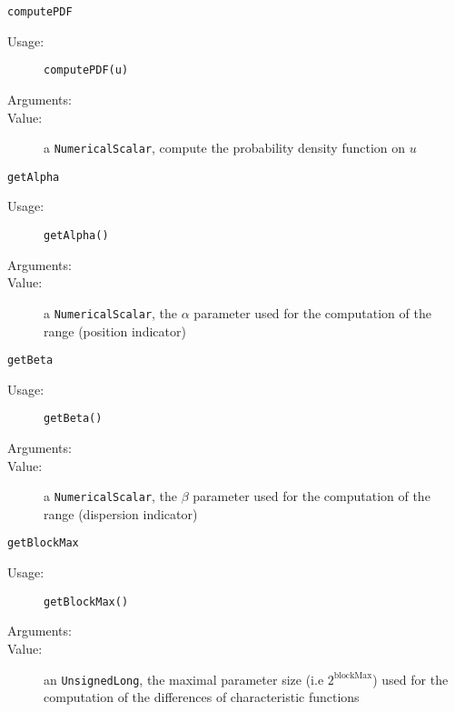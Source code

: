 \begin{description}
\begin{description}
  \item \texttt{computePDF}
    \begin{description}
    \item[Usage:]  \texttt{computePDF(u)}
    \item[Arguments:]  \strut
    \item[Value:] a \texttt{NumericalScalar}, compute the probability density function on $u$
    \end{description}

  \item \texttt{getAlpha}
    \begin{description}
    \item[Usage:]  \texttt{getAlpha()}
    \item[Arguments:]  \strut
    \item[Value:] a \texttt{NumericalScalar}, the $\alpha$ parameter used for the computation of the range (position indicator)
    \end{description}

  \item \texttt{getBeta}
    \begin{description}
    \item[Usage:]  \texttt{getBeta()}
    \item[Arguments:]  \strut
    \item[Value:] a \texttt{NumericalScalar}, the $\beta$ parameter used for the computation of the range (dispersion indicator)
    \end{description}

  \item \texttt{getBlockMax}
    \begin{description}
    \item[Usage:]  \texttt{getBlockMax()}
    \item[Arguments:]  \strut
    \item[Value:] an \texttt{UnsignedLong}, the maximal parameter size (i.e $2^{\text{blockMax}}$) used for the computation of the differences of characteristic functions
    \end{description}


\end{description}
\end{description}

